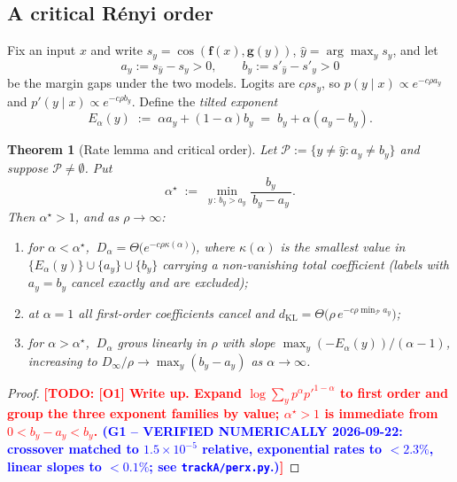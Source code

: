 \documentclass{article}
\newcommand{\TODO}[1]{\textcolor{red}{\textbf{[TODO: #1]}}}
\newcommand{\GATE}[1]{\textcolor{blue}{\textsf{\small (#1)}}}
\newcommand{\bff}{\mathbf{f}}
\newcommand{\bfg}{\mathbf{g}}
\newcommand{\dKL}{d_{\mathrm{KL}}}
\newcommand{\Dalpha}{D_{\alpha}}
\newcommand{\Dinf}{D_{\infty}}
\theoremstyle{plain}
\newtheorem{theorem}{Theorem}
\theoremstyle{definition}
\theoremstyle{remark}
\begin{document}
\subsection{A critical R\'enyi order}
\label{sec:alphastar}

Fix an input $x$ and write $s_{y}=\cos(\bff(x),\bfg(y))$, $\hat y=\arg\max_{y}s_{y}$,
and let
\begin{equation}
  a_{y}:=s_{\hat y}-s_{y}>0, \qquad b_{y}:=s'_{\hat y}-s'_{y}>0
  \label{eq:gaps}
\end{equation}
be the margin gaps under the two models. Logits are $c\rho s_{y}$, so
$p(y\mid x)\propto e^{-c\rho a_{y}}$ and $p'(y\mid x)\propto e^{-c\rho b_{y}}$.
Define the \emph{tilted exponent}
\begin{equation}
  E_{\alpha}(y) \;:=\; \alpha a_{y}+(1-\alpha)b_{y} \;=\; b_{y}+\alpha(a_{y}-b_{y}).
  \label{eq:tilted}
\end{equation}

\begin{theorem}[Rate lemma and critical order]
\label{thm:alphastar}
Let $\mathcal{P}:=\{y\neq\hat y: a_{y}\neq b_{y}\}$ and suppose
$\mathcal{P}\neq\emptyset$. Put
\begin{equation}
  \alpha^{\star}\;:=\;\min_{y\,:\,b_{y}>a_{y}}\frac{b_{y}}{\,b_{y}-a_{y}\,}.
  \label{eq:alphastar}
\end{equation}
Then $\alpha^{\star}>1$, and as $\rho\to\infty$:
\begin{enumerate}
  \item[(i)] for $\alpha<\alpha^{\star}$, $\ \Dalpha=\Theta\!\big(e^{-c\rho\kappa(\alpha)}\big)$,
        where $\kappa(\alpha)$ is the smallest value in
        $\{E_{\alpha}(y)\}\cup\{a_{y}\}\cup\{b_{y}\}$ carrying a non-vanishing
        total coefficient (labels with $a_{y}=b_{y}$ cancel exactly and are
        excluded);
  \item[(ii)] at $\alpha=1$ all first-order coefficients cancel and
        $\dKL=\Theta\!\big(\rho\,e^{-c\rho\min_{\mathcal{P}}a_{y}}\big)$;
  \item[(iii)] for $\alpha>\alpha^{\star}$, $\ \Dalpha$ grows \emph{linearly} in
        $\rho$ with slope $\max_{y}(-E_{\alpha}(y))/(\alpha-1)$, increasing to
        $\Dinf/\rho\to\max_{y}(b_{y}-a_{y})$ as $\alpha\to\infty$.
\end{enumerate}
\end{theorem}
\begin{proof}
\TODO{[O1] Write up. Expand $\log\sum_{y}p^{\alpha}p'^{1-\alpha}$ to first order
and group the three exponent families by value; $\alpha^{\star}>1$ is immediate
from $0<b_{y}-a_{y}<b_{y}$. \GATE{G1 -- VERIFIED NUMERICALLY 2026-09-22:
crossover matched to $1.5\times10^{-5}$ relative, exponential rates to $<2.3\%$,
linear slopes to $<0.1\%$; see \texttt{trackA/perx.py}.}}
\end{proof}
\end{document}
